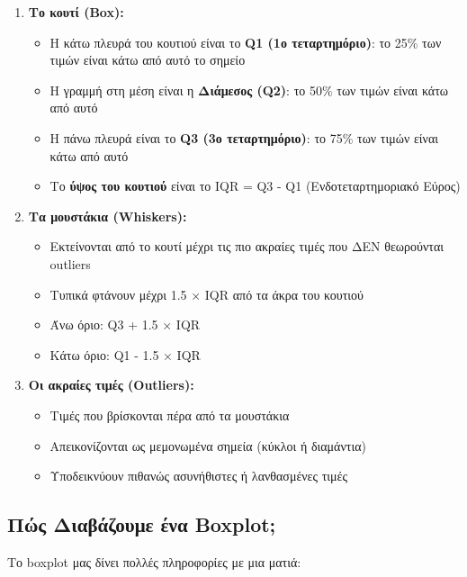 \documentclass[12pt,a4paper]{article}
\begin{document}
\begin{enumerate}
    \item \textbf{Το κουτί (Box):}
    \begin{itemize}
        \item Η κάτω πλευρά του κουτιού είναι το \textbf{Q1 (1ο τεταρτημόριο)}: το 25\% των τιμών είναι κάτω από αυτό το σημείο
        \item Η γραμμή στη μέση είναι η \textbf{Διάμεσος (Q2)}: το 50\% των τιμών είναι κάτω από αυτό
        \item Η πάνω πλευρά είναι το \textbf{Q3 (3ο τεταρτημόριο)}: το 75\% των τιμών είναι κάτω από αυτό
        \item Το \textbf{ύψος του κουτιού} είναι το IQR = Q3 - Q1 (Ενδοτεταρτημοριακό Εύρος)
    \end{itemize}
    
    \item \textbf{Τα μουστάκια (Whiskers):}
    \begin{itemize}
        \item Εκτείνονται από το κουτί μέχρι τις πιο ακραίες τιμές που ΔΕΝ θεωρούνται outliers
        \item Τυπικά φτάνουν μέχρι 1.5 × IQR από τα άκρα του κουτιού
        \item Άνω όριο: Q3 + 1.5 × IQR
        \item Κάτω όριο: Q1 - 1.5 × IQR
    \end{itemize}
    
    \item \textbf{Οι ακραίες τιμές (Outliers):}
    \begin{itemize}
        \item Τιμές που βρίσκονται πέρα από τα μουστάκια
        \item Απεικονίζονται ως μεμονωμένα σημεία (κύκλοι ή διαμάντια)
        \item Υποδεικνύουν πιθανώς ασυνήθιστες ή λανθασμένες τιμές
    \end{itemize}
\end{enumerate}

\subsection{Πώς Διαβάζουμε ένα Boxplot;}

Το boxplot μας δίνει πολλές πληροφορίες με μια ματιά:
\end{document}

